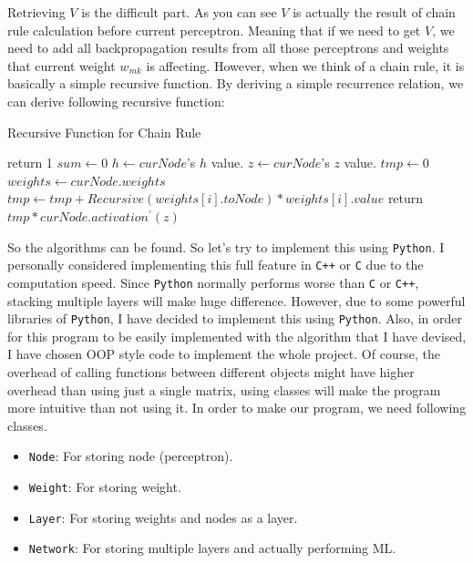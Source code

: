 \documentclass{homework}
\begin{document}
Retrieving $V$ is the difficult part. As you can see $V$ is actually the result of chain rule calculation before current perceptron. Meaning that if we need to get $V$, we need to add all backpropagation results from all those perceptrons and weights that current weight $w_{mk}$ is affecting. However, when we think of a chain rule, it is basically a simple recursive function. By deriving a simple recurrence relation, we can derive following recursive function:

\begin{algorithm}
\caption{Recursive Function for Chain Rule}\label{alg:cap}
\begin{algorithmic}
  
    \State return 1
\Else 
    \State $sum \gets 0$
    \State $h \gets curNode$'s $h$ value.
    \State $z \gets curNode$'s $z$ value.
    \State $tmp \gets 0$ 
    \State $weights \gets curNode.weights$
     
        \State $tmp \gets tmp + Recursive(weights[i].toNode) * weights[i].value$ 
    \EndFor
    \State return $tmp * curNode.activation^\prime(z)$
\EndIf
\end{algorithmic}
\end{algorithm}

\pagebreak
So the algorithms can be found. So let's try to implement this using \texttt{Python}. I personally considered implementing this full feature in \texttt{C++} or \texttt{C} due to the computation speed. Since \texttt{Python} normally performs worse than \texttt{C} or \texttt{C++}, stacking multiple layers will make huge difference. However, due to some powerful libraries of \texttt{Python}, I have decided to implement this using \texttt{Python}. Also, in order for this program to be easily implemented with the algorithm that I have devised, I have chosen OOP style code to implement the whole project. Of course, the overhead of calling functions between different objects might have higher overhead than using just a single matrix, using classes will make the program more intuitive than not using it. In order to make our program, we need following classes.

\begin{itemize}
    \item \texttt{Node}: For storing node (perceptron).
    \item \texttt{Weight}: For storing weight.
    \item \texttt{Layer}: For storing weights and nodes as a layer.
    \item \texttt{Network}: For storing multiple layers and actually performing ML.
\end{itemize}
\end{document}

